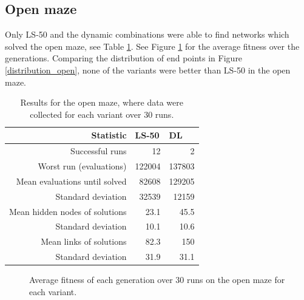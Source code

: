 \subsection{Open maze}
Only LS-50 and the dynamic combinations were able to find networks which solved the open maze, see Table \ref{open}.
See Figure \ref{open_fitness} for the average fitness over the generations. Comparing the distribution of end points in Figure \ref{distribution_open},
none of the variants were better than LS-50 in the open maze.
\begin{table}[H]
    \centering
    \begin{tabular}{rrr}
    \toprule
    Statistic & \multicolumn{1}{l}{LS-50} & \multicolumn{1}{l}{DL} \\
    \midrule
    Successful runs & 12 & 2 \\
    Worst run (evaluations) & 122004 & 137803 \\
    \rowcolor[gray]{.9} Mean evaluations until solved & 82608 & 129205 \\
    Standard deviation & 32539  & 12159 \\
    \rowcolor[gray]{.9} Mean hidden nodes of solutions & 23.1 & 45.5 \\
    Standard deviation & 10.1 & 10.6 \\
    \rowcolor[gray]{.9} Mean links of solutions & 82.3  & 150 \\
    Standard deviation & 31.9  & 31.1 \\
    \bottomrule
    \end{tabular}
    \caption{Results for the open maze, where data were collected for each variant over 30 runs.}
    \label{open}
\end{table}

\begin{figure}[H]
    \begin{center}
        
    \end{center}
    \caption{Average fitness of each generation over 30 runs on the open maze for each variant.}
    \label{open_fitness}
\end{figure}

